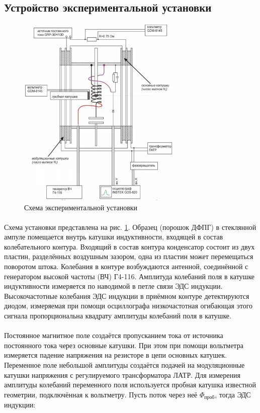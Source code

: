 \documentclass[a4paper,12pt]{article} %
\begin{document}
\subsection{Устройство экспериментальной установки}


\begin{figure}[h]
\centering
\includegraphics[width=0.7\textwidth]{setup.png}
\caption{Схема экспериментальной установки}
\label{fig:setup}
\end{figure}

\paragraph{} Схема установки представлена на рис. \ref{fig:setup}. Образец (порошок ДФПГ) в стеклянной ампуле помещается внутрь катушки индуктивности, входящей в состав колебательного контура. Входящий в состав контура конденсатор состоит из двух пластин, разделённых воздушным зазором, одна из пластин может перемещаться поворотом штока. Колебания в контуре возбуждаются антенной, соединённой с генератором высокой частоты (ВЧ) Г4-116. Амплитуда колебаний поля в катушке индуктивности измеряется по наводимой в петле связи ЭДС индукции. Высокочастотные колебания ЭДС индукции в приёмном контуре детектируются диодом, измеряемая при помощи осциллографа низкочастотная огибающая этого сигнала пропорциональна квадрату амплитуды колебаний поля в катушке.

\paragraph{}Постоянное магнитное поле создаётся пропусканием тока от источника постоянного тока через основные катушки. При этом при помощи вольтметра измеряется падение напряжения на резисторе в цепи основных катушек. Переменное поле небольшой амплитуды создаётся подачей на модуляционные катушки напряжения с регулируемого трансформатора ЛАТР. Для измерения амплитуды колебаний переменного поля используется пробная катушка известной геометрии, подключённая к вольтметру. Пусть поток через неё $\Phi_{\text{проб}}$, тогда ЭДС индукции:
\end{document}
